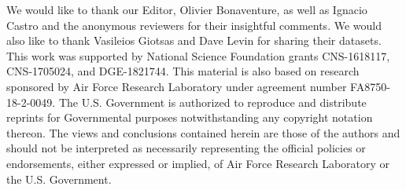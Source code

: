\documentclass[sigconf]{acmart}
\begin{document}
\begin{acks}
We would like to thank our Editor, Olivier Bonaventure, as well as Ignacio Castro and the anonymous reviewers for their insightful comments. We would also like to thank Vasileios Giotsas and Dave Levin for sharing their datasets. This work was supported by National Science Foundation grants CNS-1618117, CNS-1705024, and DGE-1821744.
This material is also based on research sponsored by Air Force Research Laboratory under agreement number FA8750-18-2-0049. The U.S. Government is authorized to reproduce and distribute reprints for Governmental purposes notwithstanding any copyright notation thereon. The views and conclusions contained herein are those of the authors and should not be interpreted as necessarily representing the official policies or endorsements, either expressed or implied, of Air Force Research Laboratory or the U.S. Government.
\end{acks}


%

\end{document}
